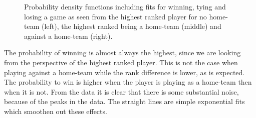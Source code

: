 \documentclass{llncs}
\begin{document}
\begin{figure}[h]
  \centering
  \caption{Probability density functions including fits for winning, tying and losing a game as seen from the highest ranked player for no home-team (left), the highest ranked being a home-team (middle) and against a home-team (right).}
  \label{fig:hist}
\end{figure}

The probability of winning is almost always the highest, since we are looking from the perspective of the highest ranked player. This is not the case when playing against a home-team while the rank difference is lower, as is expected. The probability to win is higher when the player is playing as a home-team then when it is not. From the data it is clear that there is some substantial noise, because of the peaks in the data. The straight lines are simple exponential fits which smoothen out these effects.
\end{document}

